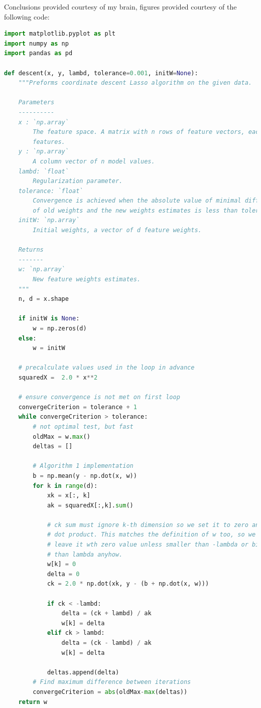 \documentclass{article}
\newcommand{\1}{\mathbf{1}}
\begin{document}
\begin{enumerate}
Conclusions provided courtesy of my brain, figures provided courtesy of the following code:
    
\begin{lstlisting}[language=Python]
import matplotlib.pyplot as plt
import numpy as np
import pandas as pd

def descent(x, y, lambd, tolerance=0.001, initW=None):
    """Preforms coordinate descent Lasso algorithm on the given data.

    Parameters
    ----------
    x : `np.array`
        The feature space. A matrix with n rows of feature vectors, each with d
        features.
    y : `np.array`
        A column vector of n model values.
    lambd: `float`
        Regularization parameter.
    tolerance: `float`
        Convergence is achieved when the absolute value of minimal difference
        of old weights and the new weights estimates is less than tolerance.
    initW: `np.array`
        Initial weights, a vector of d feature weights.

    Returns
    -------
    w: `np.array`
        New feature weights estimates. 
    """
    n, d = x.shape

    if initW is None:
        w = np.zeros(d)
    else:
        w = initW

    # precalculate values used in the loop in advance
    squaredX =  2.0 * x**2

    # ensure convergence is not met on first loop
    convergeCriterion = tolerance + 1
    while convergeCriterion > tolerance:
        # not optimal test, but fast
        oldMax = w.max()
        deltas = []

        # Algorithm 1 implementation
        b = np.mean(y - np.dot(x, w))
        for k in range(d):
            xk = x[:, k]
            ak = squaredX[:,k].sum()

            # ck sum must ignore k-th dimension so we set it to zero and use
            # dot product. This matches the definition of w too, so we can
            # leave it wth zero value unless smaller than -lambda or bigger
            # than lambda anyhow. 
            w[k] = 0
            delta = 0
            ck = 2.0 * np.dot(xk, y - (b + np.dot(x, w)))

            if ck < -lambd:
                delta = (ck + lambd) / ak
                w[k] = delta
            elif ck > lambd:
                delta = (ck - lambd) / ak
                w[k] = delta

            deltas.append(delta)
        # Find maximum difference between iterations
        convergeCriterion = abs(oldMax-max(deltas))
    return w



\end{lstlisting}
\end{enumerate}
\end{document}
